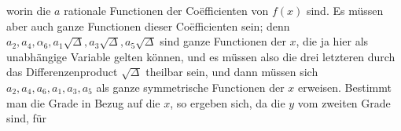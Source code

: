 
worin die $a$ rationale Functionen der Coëfficienten von $f(x)$ sind.
Es müssen aber auch ganze Functionen dieser Coëfficienten sein;
denn $a_2, a_4, \alpha_6, a_1\sqrt{\varDelta}, a_3\sqrt{\varDelta}, a_5\sqrt{\varDelta}$ sind ganze Functionen der %
$x$, die ja hier als unabhängige Variable gelten können, und es
müssen also die drei letzteren durch das Differenzenproduct $\sqrt{\varDelta}$
theilbar sein, und dann müssen sich $a_2, a_4, a_6, a_1, a_3, a_5$ als ganze
symmetrische Functionen der $x$ erweisen. Bestimmt man die
Grade in Bezug auf die $x$, so ergeben sich, da die $y$ vom zweiten
Grade sind, für
